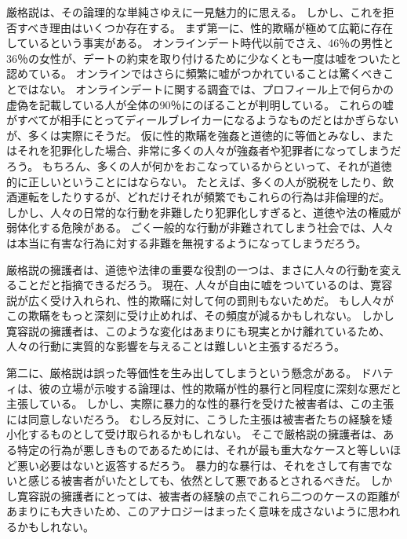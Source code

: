 \documentclass[paper=a4,book,openany]{jlreq}
\begin{document}
厳格説は、その論理的な単純さゆえに一見魅力的に思える。
しかし、これを拒否すべき理由はいくつか存在する。
まず第一に、性的欺瞞が極めて広範に存在しているという事実がある。
オンラインデート時代以前でさえ、46％の男性と36％の女性が、デートの約束を取り付けるために少なくとも一度は嘘をついたと認めている\citep{rowatt99:_lying_get_date}。
オンラインではさらに頻繁に嘘がつかれていることは驚くべきことではない。
オンラインデートに関する調査では、プロフィール上で何らかの虚偽を記載している人が全体の90％にのぼることが判明している\citep{hancock07:_truth_lying_onlin_datin_profil}。
これらの嘘がすべてが相手にとってディールブレイカーになるようなものだとはかぎらないが、多くは実際にそうだ。
仮に性的欺瞞を強姦と道徳的に等価とみなし、またはそれを犯罪化した場合、非常に多くの人々が強姦者や犯罪者になってしまうだろう。
もちろん、多くの人が何かをおこなっているからといって、それが道徳的に正しいということにはならない。
たとえば、多くの人が脱税をしたり、飲酒運転をしたりするが、どれだけそれが頻繁でもこれらの行為は非倫理的だ。
しかし、人々の日常的な行動を非難したり犯罪化しすぎると、道徳や法の権威が弱体化する危険がある。
ごく一般的な行動が非難されてしまう社会では、人々は本当に有害な行為に対する非難を無視するようになってしまうだろう。

厳格説の擁護者は、道徳や法律の重要な役割の一つは、まさに人々の行動を変えることだと指摘できるだろう。
現在、人々が自由に嘘をついているのは、寛容説が広く受け入れられ、性的欺瞞に対して何の罰則もないためだ。
もし人々がこの欺瞞をもっと深刻に受け止めれば、その頻度が減るかもしれない。
しかし寛容説の擁護者は、このような変化はあまりにも現実とかけ離れているため、人々の行動に実質的な影響を与えることは難しいと主張するだろう。

第二に、厳格説は誤った等価性を生み出してしまうという懸念がある。
ドハティは、彼の立場が示唆する論理は、性的欺瞞が性的暴行と同程度に深刻な悪だと主張している。
しかし、実際に暴力的な性的暴行を受けた被害者は、この主張には同意しないだろう。
むしろ反対に、こうした主張は被害者たちの経験を矮小化するものとして受け取られるかもしれない。
そこで厳格説の擁護者は、ある特定の行為が悪しきものであるためには、それが最も重大なケースと等しいほど悪い必要はないと返答するだろう。
暴力的な暴行は、それをさして有害でないと感じる被害者がいたとしても、依然として悪であるとされるべきだ。
しかし寛容説の擁護者にとっては、被害者の経験の点でこれら二つのケースの距離があまりにも大きいため、このアナロジーはまったく意味を成さないように思われるかもしれない。
\end{document}
